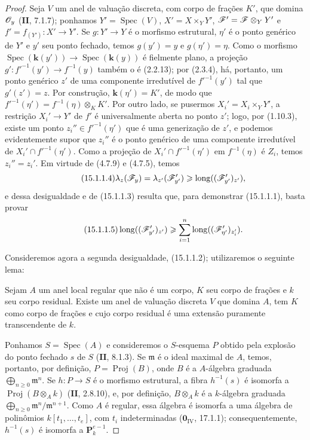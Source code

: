 \begin{proof}
Seja $V$ um anel de valuação discreta, com corpo de frações $K'$, que domina $\mathscr{O}_y$ ($\textbf{II}$, 7.1.7); ponhamos $Y'=\operatorname{Spec}(V)$, $X'=X\times_Y Y'$, $\mathscr{F}'=\mathscr{F}\otimes_Y Y'$ e $f'=f_{(Y')}:X'\to Y'$. Se $g:Y'\to Y$ é o morfismo estrutural, $\eta'$ é o ponto genérico de $Y'$ e $y'$ seu ponto fechado, temos $g(y')=y$ e $g(\eta')=\eta$. Como o morfismo $\operatorname{Spec}(\mathbf{k}(y'))\to\operatorname{Spec}(\mathbf{k}(y))$ é fielmente plano, a projeção $g':f'^{-1}(y')\to f^{-1}(y)$ também o é (2.2.13); por (2.3.4), há, portanto, um ponto genérico $z'$ de uma componente irredutível de $f'^{-1}(y')$ tal que $g'(z')=z$. Por construção, $\mathbf{k}(\eta')=K'$, de modo que $f'^{-1}(\eta')=f^{-1}(\eta)\otimes_K K'$. Por outro lado, se pusermos $X_i'=X_i\times_Y Y'$, a restrição $X_i'\to Y'$ de $f'$ é universalmente aberta no ponto $z'$; logo, por (1.10.3), existe um ponto $z_i''\in f'^{-1}(\eta')$ que é uma generização de $z'$, e podemos evidentemente supor que $z_i''$ é o ponto genérico de uma componente irredutível de $X_i'\cap f'^{-1}(\eta')$. Como a projeção de $X_i'\cap f'^{-1}(\eta')$ em $f^{-1}(\eta)$ é $Z_i$, temos $z_i''=z_i'$. Em virtude de (4.7.9) e (4.7.5), temos
\[
\tag{15.1.1.4}
\label{IV.15.1.1.4}
  \lambda_z(\sh{F}_y)=\lambda_{z'}(\sh{F}'_{y'})
  \geqslant\operatorname{long}((\sh{F}'_{y'})_{z'}),
\]
e dessa desigualdade e de (15.1.1.3) resulta que, para demonstrar (15.1.1.1), basta provar
\[
\tag{15.1.1.5}
\label{IV.15.1.1.5}
  \operatorname{long}((\sh{F}'_{y'})_{z'})\geqslant
  \sum_{i=1}^{n}\operatorname{long}((\sh{F}'_{\eta'})_{z_i'}).
\]

Consideremos agora a segunda desigualdade, (15.1.1.2); utilizaremos o seguinte lema:

\begin{lemma}[15.1.1.6]
\label{IV.15.1.1.6}
Sejam $A$ um anel local regular que não é um corpo, $K$ seu corpo de frações e $k$ seu corpo residual. Existe um anel de valuação discreta $V$ que domina $A$, tem $K$ como corpo de frações e cujo corpo residual é uma extensão puramente transcendente de $k$.
\end{lemma}

Ponhamos $S=\operatorname{Spec}(A)$ e consideremos o $S$-esquema $P$ obtido pela explosão do ponto fechado $s$ de $S$ ($\textbf{II}$, 8.1.3). Se $\mathfrak m$ é o ideal maximal de $A$, temos, portanto, por definição, $P=\operatorname{Proj}(B)$, onde $B$ é a $A$-álgebra graduada $\bigoplus_{n\geqslant0}\mathfrak m^n$. Se $h:P\to S$ é o morfismo estrutural, a fibra $h^{-1}(s)$ é isomorfa a $\operatorname{Proj}(B\otimes_A k)$ ($\textbf{II}$, 2.8.10), e, por definição, $B\otimes_A k$ é a $k$-álgebra graduada $\bigoplus_{n\geqslant0}\mathfrak m^n/\mathfrak m^{n+1}$. Como $A$ é regular, essa álgebra é isomorfa a uma álgebra de polinômios $k[t_1,\ldots,t_e]$, com $t_i$ indeterminadas ($\mathbf{0}_{\mathrm{IV}}$, 17.1.1); consequentemente, $h^{-1}(s)$ é isomorfa a $\mathbf P_k^{e-1}$.


\end{proof}

